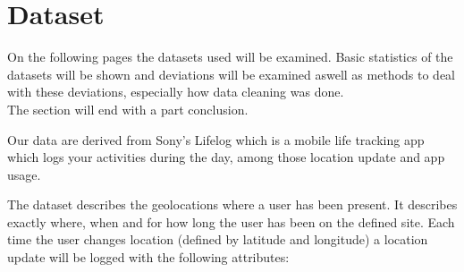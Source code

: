 \chapter{Dataset}
\label{chap:dataset}
On the following pages the datasets used will be examined. Basic statistics of the datasets will be shown and deviations will be examined aswell as methods to deal with these deviations, especially how data cleaning was done. \\
The section will end with a part conclusion. 

Our data are derived from Sony's Lifelog\cite{sonyLifeLog} which is a mobile life tracking app which logs your activities during the day, among those location update and app usage. 

The dataset describes the geolocations where a user has been present. It describes exactly where, when and for how long the user has been on the defined site. Each time the user changes location (defined by latitude and longitude) a location update will be logged with the following attributes: 

